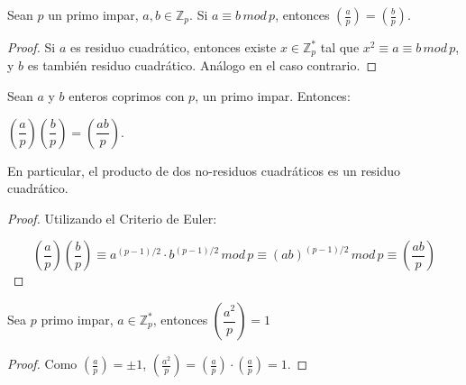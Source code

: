 \begin{proposition}
	Sean $p$ un primo impar, $a,b\in \mathbb{Z}_p$.
	Si $a\equiv b \, mod \, p$, entonces $\left( \frac{a}{p} \right) = \left( \frac{b}{p} \right)$.
\end{proposition}


\begin{proof}
	Si $a$ es residuo cuadrático, entonces existe $x\in \mathbb{Z}_p^*$ tal que $x^2 \equiv a\equiv b \, mod \, p$, y $b$ es también residuo cuadrático. Análogo en el caso contrario.	
\end{proof}


\begin{proposition}
	Sean $a$ y $b$ enteros coprimos con $p$, un primo impar. Entonces:
	
\begin{center}
 	$
		\left( \dfrac{a}{p} \right) 	\left( \dfrac{b}{p} \right) = 	\left( \dfrac{ab}{p} \right) 
	$.
\end{center}
	
	En particular, el producto de dos no-residuos cuadráticos es un residuo cuadrático.
	
\end{proposition}

\begin{proof}
	Utilizando el Criterio de Euler:
	
	\[
			\left( \dfrac{a}{p} \right) 	\left( \dfrac{b}{p} \right) \equiv
			a^{(p-1)/2} \cdot b^{(p-1)/2} \, mod \, p \equiv (ab)^{(p-1)/2} \, mod \, p \equiv	\left( \dfrac{ab}{p} \right) 
	\]
	
\end{proof}

\begin{corollary} Sea $p$ primo impar, $a \in \mathbb{Z}_p^*$, entonces
	$\left( \dfrac{a^2}{p} \right) = 1$
\end{corollary}

\begin{proof}
	Como $\left( \frac{a}{p} \right) = \pm 1$, $\left( \frac{a^2}{p} \right) = \left( \frac{a}{p} \right)\cdot \left( \frac{a}{p} \right) = 1$.
\end{proof}

